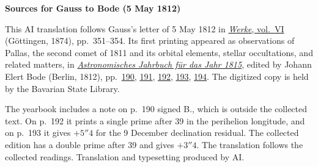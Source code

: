 \clearpage\thispagestyle{empty}
\begin{center}\textbf{Sources for Gauss to Bode (5 May 1812)}\end{center}
\noindent This AI translation follows Gauss’s letter of 5 May 1812 in \href{https://gdz.sub.uni-goettingen.de/id/PPN236007467}{\textit{Werke}, vol.~VI} (Göttingen, 1874), pp.~351--354. Its first printing appeared as observations of Pallas, the second comet of 1811 and its orbital elements, stellar occultations, and related matters, in \href{https://api.digitale-sammlungen.de/iiif/image/v2/bsb10538344_00005/full/1600,/0/default.jpg}{\textit{Astronomisches Jahrbuch für das Jahr 1815}}, edited by Johann Elert Bode (Berlin, 1812), pp.~\href{https://api.digitale-sammlungen.de/iiif/image/v2/bsb10538344_00198/full/1600,/0/default.jpg}{190}, \href{https://api.digitale-sammlungen.de/iiif/image/v2/bsb10538344_00199/full/1600,/0/default.jpg}{191}, \href{https://api.digitale-sammlungen.de/iiif/image/v2/bsb10538344_00200/full/1600,/0/default.jpg}{192}, \href{https://api.digitale-sammlungen.de/iiif/image/v2/bsb10538344_00201/full/1600,/0/default.jpg}{193}, \href{https://api.digitale-sammlungen.de/iiif/image/v2/bsb10538344_00202/full/1600,/0/default.jpg}{194}. The digitized copy is held by the Bavarian State Library.
\par\smallskip\noindent The yearbook includes a note on p.~190 signed B., which is outside the collected text. On p.~192 it prints a single prime after 39 in the perihelion longitude, and on p.~193 it gives $+5''4$ for the 9 December declination residual. The collected edition has a double prime after 39 and gives $+3''4$. The translation follows the collected readings. Translation and typesetting produced by AI.
\clearpage
